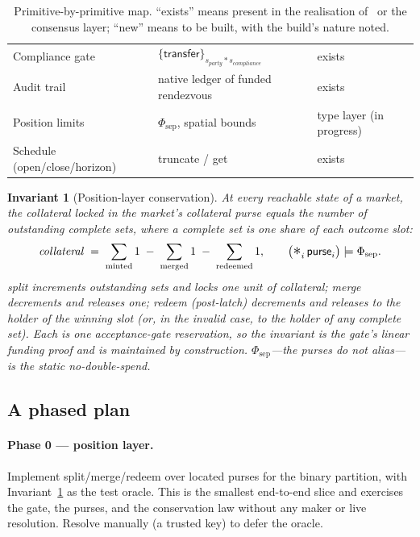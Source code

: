 \documentclass[11pt]{article}
\newtheorem{invariant}{Invariant}[section]
\newcommand{\sep}{\mathbin{\ast}}
\newcommand{\bigsep}{\mathop{\vphantom{\sum}\text{\Large$\ast$}}\displaylimits}
\begin{document}
\begin{table}[h]
\begin{tabular}{@{}p{3.5cm}p{5.3cm}p{4.4cm}@{}}
Compliance gate & $\{\mathsf{transfer}\}_{s_{\mathit{party}}\sep s_{\mathit{compliance}}}$ & exists \\
Audit trail & native ledger of funded rendezvous & exists \\
Position limits & $\Phi_{\mathrm{sep}}$, spatial bounds \cite[\S8]{finrho} & type layer (in progress) \\
Schedule (open/close/horizon) & \textsf{truncate} / \textsf{get} & exists \\
\bottomrule
\end{tabular}
\caption{Primitive-by-primitive map. ``exists'' means present in the realisation
of~\cite{finrho} or the consensus layer; ``new'' means to be built, with the build's nature
noted.}
\label{tab:map}
\end{table}

\begin{invariant}[Position-layer conservation]\label{inv:cons}
At every reachable state of a market, the collateral locked in the market's collateral purse
equals the number of outstanding complete sets, where a complete set is one share of each
outcome slot:
\[
\mathit{collateral} \;=\; \sum_{\text{minted}} 1 \;-\; \sum_{\text{merged}} 1 \;-\; \sum_{\text{redeemed}} 1,
\qquad
\bigl(\textstyle\bigsep_i \mathsf{purse}_i\bigr) \models \Phi_{\mathrm{sep}}.
\]
\textsf{split} increments outstanding sets and locks one unit of collateral; \textsf{merge}
decrements and releases one; \textsf{redeem} (post-latch) decrements and releases to the
holder of the winning slot (or, in the invalid case, to the holder of any complete set). Each
is one acceptance-gate reservation, so the invariant is the gate's linear funding proof and is
maintained by construction. $\Phi_{\mathrm{sep}}$---the purses do not alias---is the static
no-double-spend.
\end{invariant}

\subsection{A phased plan}

\paragraph{Phase 0 --- position layer.} Implement \textsf{split}/\textsf{merge}/\textsf{redeem}
over located purses for the binary partition, with Invariant~\ref{inv:cons} as the test oracle.
This is the smallest end-to-end slice and exercises the gate, the purses, and the conservation
law without any maker or live resolution. Resolve manually (a trusted key) to defer the oracle.
\end{document}
